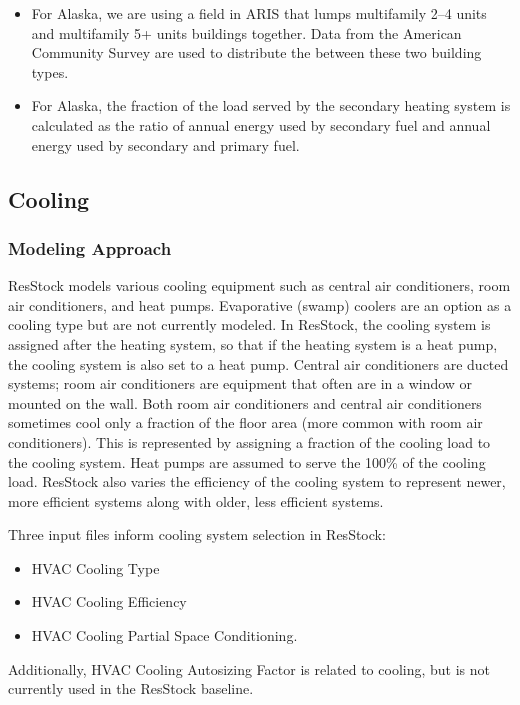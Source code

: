 \begin{itemize}
    \item For Alaska, we are using a field in ARIS that lumps multifamily 2--4 units and multifamily 5+ units buildings together. Data from the American Community Survey are used to distribute the between these two building types.
    \item For Alaska, the fraction of the load served by the secondary heating system is calculated as the ratio of annual energy used by secondary fuel and annual energy used by secondary and primary fuel.
\end{itemize}
 

\subsection{Cooling}
\subsubsection{Modeling Approach}
ResStock models various cooling equipment such as central air conditioners, room air conditioners, and heat pumps. Evaporative (swamp) coolers are an option as a cooling type but are not currently modeled. In ResStock, the cooling system is assigned after the heating system, so that if the heating system is a heat pump, the cooling system is also set to a heat pump. Central air conditioners are ducted systems; room air conditioners are equipment that often are in a window or mounted on the wall. Both room air conditioners and central air conditioners sometimes cool only a fraction of the floor area (more common with room air conditioners). This is represented by assigning a fraction of the cooling load to the cooling system. Heat pumps are assumed to serve the 100\% of the cooling load. ResStock also varies the efficiency of the cooling system to represent newer, more efficient systems along with older, less efficient systems.

Three input files inform cooling system selection in ResStock:
\begin{itemize}
    \item HVAC Cooling Type
    \item HVAC Cooling Efficiency
    \item HVAC Cooling Partial Space Conditioning.
\end{itemize}

Additionally, HVAC Cooling Autosizing Factor is related to cooling, but is not currently used in the ResStock baseline.

